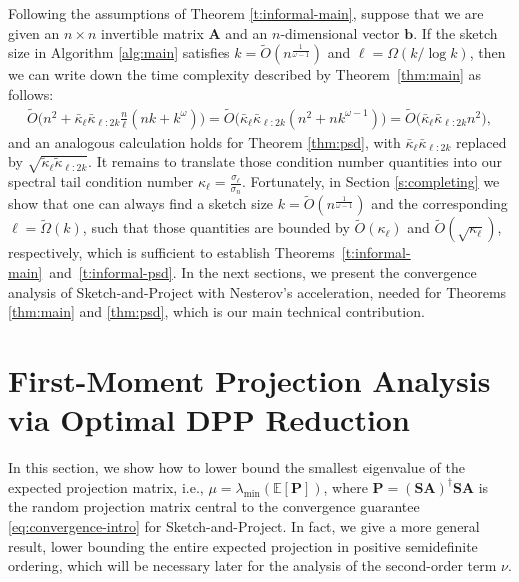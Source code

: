 \documentclass[11pt]{article}
\def\b{{\mathbf b}}
\def\A{{\mathbf A}}
\def\S{{\mathbf S}}
\def\P{{\mathbf P}}
\def\E{{\mathds E}}
\begin{document}
Following the assumptions of Theorem \ref{t:informal-main}, suppose that we are given an $n\times n$ invertible matrix $\A$ and an $n$-dimensional vector $\b$. If the sketch size in Algorithm \ref{alg:main} satisfies $k=\tilde O(n^{\frac1{\omega-1}})$ and $\ell=\Omega(k/\log k)$, then we can write down the time complexity described by Theorem~\ref{thm:main} as follows:
\begin{align*}
    \tilde O\Big(n^2 + \bar\kappa_{\ell}\bar\kappa_{\ell:2k}\frac n\ell (nk + k^\omega)\Big)
= \tilde O\Big(\bar\kappa_{\ell}\bar\kappa_{\ell:2k}(n^2 + nk^{\omega-1})\Big) = \tilde O\big(\bar\kappa_{\ell}\bar\kappa_{\ell:2k}n^2\big),
\end{align*}
and an analogous calculation holds for Theorem \ref{thm:psd}, with $\bar\kappa_\ell\bar\kappa_{\ell:2k}$ replaced by $\sqrt{\tilde\kappa_\ell\tilde\kappa_{\ell:2k}}$. It remains to translate those condition number quantities into our spectral tail condition number $\kappa_\ell=\frac{\sigma_\ell}{\sigma_n}$. Fortunately, in Section \ref{s:completing} we show that one can always find a sketch size $k=\tilde O(n^{\frac1{\omega-1}})$ and the corresponding $\ell=\tilde\Omega(k)$, such that those quantities are bounded by $\tilde O(\kappa_\ell)$ and $\tilde O(\sqrt{\kappa_\ell})$, respectively, which is sufficient to establish Theorems~\ref{t:informal-main}~and~\ref{t:informal-psd}. In the next sections, we present the convergence analysis of Sketch-and-Project with Nesterov's acceleration, needed for Theorems \ref{thm:main} and \ref{thm:psd}, which is our main technical contribution.

\section{First-Moment Projection Analysis via Optimal DPP Reduction}
\label{s:mu}
In this section, we show how to lower bound the smallest eigenvalue of the expected projection matrix, i.e., $\mu = \lambda_{\min}(\E[\P])$, where $\P=(\S\A)^\dagger\S\A$ is the random projection matrix central to the convergence guarantee \eqref{eq:convergence-intro} for Sketch-and-Project. In fact, we give a more general result, lower bounding the entire expected projection in positive semidefinite ordering, which will be necessary later for the analysis of the second-order term $\nu$.
\end{document}
